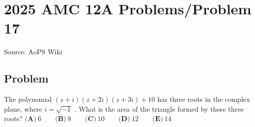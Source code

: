 \documentclass[12pt]{article}
\begin{document}
\section*{{2025 AMC 12A Problems/Problem 17}}
Source: AoPS Wiki

\subsection*{Problem}
The polynomial $(z + i)(z + 2i)(z + 3i) + 10$ has three roots in the complex plane, where $i = \sqrt{-1}$ . What is the area of the triangle formed by these three roots? $\textbf{(A)}~6 \qquad \textbf{(B)}~8 \qquad \textbf{(C)}~10 \qquad \textbf{(D)}~12 \qquad \textbf{(E)}~14$
\end{document}
